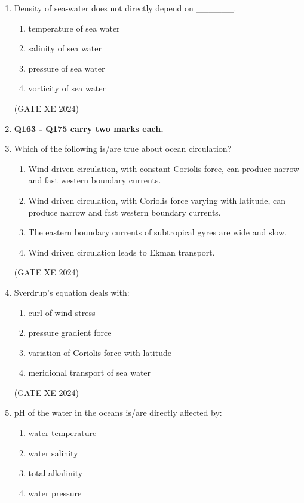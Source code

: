 \documentclass[12pt]{article}
\begin{document}
\begin{enumerate}
(GATE XE 2024)

\item Density of sea-water does not directly depend on \_\_\_\_\_\_.

\begin{enumerate}
\item temperature of sea water  
\item salinity of sea water  
\item pressure of sea water  
\item vorticity of sea water  
\end{enumerate}

(GATE XE 2024)

\item[] \textbf{Q163 - Q175 carry two marks each.}
\item Which of the following is/are true about ocean circulation?

\begin{enumerate}
\item Wind driven circulation, with constant Coriolis force, can produce narrow and fast western boundary currents.  
\item Wind driven circulation, with Coriolis force varying with latitude, can produce narrow and fast western boundary currents.  
\item The eastern boundary currents of subtropical gyres are wide and slow.  
\item Wind driven circulation leads to Ekman transport.  
\end{enumerate}

(GATE XE 2024)

\item Sverdrup’s equation deals with:

\begin{enumerate}
\item curl of wind stress  
\item pressure gradient force  
\item variation of Coriolis force with latitude  
\item meridional transport of sea water  
\end{enumerate}

(GATE XE 2024)

\item pH of the water in the oceans is/are directly affected by:

\begin{enumerate}
\item water temperature  
\item water salinity  
\item total alkalinity  
\item water pressure  
\end{enumerate}


\end{enumerate}
\end{document}

